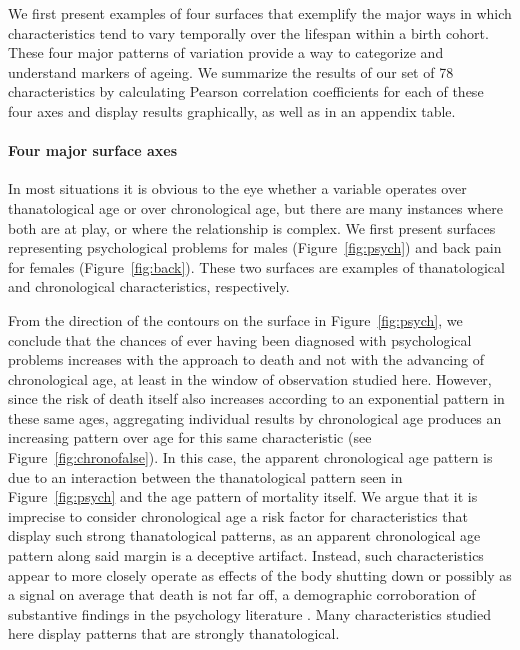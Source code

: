 \documentclass[11pt,oneside]{article} %
\begin{document}
We first present examples of four surfaces that exemplify the major ways in
which characteristics tend to vary temporally over the lifespan within a birth
cohort. These four major patterns of variation provide a way to categorize and
understand markers of ageing. We summarize the results of our set of 78
characteristics by calculating Pearson correlation coefficients for each of
these four axes and display results graphically, as well as in an appendix
table.

\paragraph{Four major surface axes}
In most situations it is obvious to the eye whether a
variable operates over thanatological age or over chronological age, but there
are many instances where both are at play, or where the relationship is
complex. We first present surfaces representing psychological problems for males
(Figure~\ref{fig:psych}) and back pain for females (Figure~\ref{fig:back}).
These two surfaces are examples of thanatological and
chronological characteristics, respectively.

From the direction of the contours on the surface in Figure~\ref{fig:psych}, we
conclude that the chances of ever having been diagnosed with psychological
problems increases with the approach to death and not with the advancing of
chronological age, at least in the window of observation studied here.
However, since the risk of death itself also increases according to an
exponential pattern in these same ages, aggregating individual results by
chronological age produces an increasing pattern over age for this same
characteristic (see Figure~\ref{fig:chronofalse}).
In this case, the apparent chronological age pattern is due
to an interaction between the thanatological pattern seen in
Figure~\ref{fig:psych} and the age pattern of mortality itself. We argue that it
is imprecise to consider chronological age a risk factor for characteristics that display such strong thanatological patterns, as an
apparent chronological age pattern along said margin is a deceptive artifact.
Instead, such characteristics appear to more closely operate as effects of the body shutting down or possibly as a signal on average that death is not far off, a demographic corroboration of substantive findings in the psychology literature \citep{carstensen2006influence}. Many characteristics studied here display patterns that are strongly thanatological.
\end{document}
